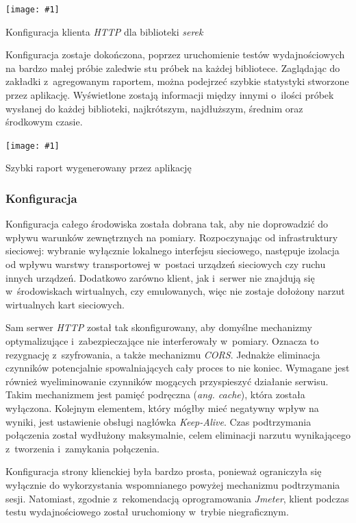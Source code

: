 \documentclass[12pt]{article}
\newcommand{\n}{\newline}
\newcommand{\putss}[3]{
\begin{captioned}[H]
	\centering
	\texttt{[image: \#1]}
	\caption{#2}
	\label{#3}
	\medskip
\end{captioned}
}
\newcommand{\nonpl}[1]{{\it #1}}
\newcommand{\code}[1]{{\it #1}}
\newcommand{\ang}[1]{\nonpl{ang. #1}}
\newcommand{\HTTP}{\nonpl{HTTP} }
\newcommand{\Jmeter}{\nonpl{Jmeter}\texttrademark}
\newcommand{\serek}{\nonpl{serek}}
\begin{document}
{{{				\putss{./img/jmeter_ss/http_serek_config.png}{ Konfiguracja klienta \HTTP dla biblioteki \serek}{jmeter_config_http}

				Konfiguracja zostaje dokończona, poprzez uruchomienie testów wydajnościowych na bardzo małej próbie zaledwie stu próbek
				na każdej bibliotece. Zaglądając do zakładki z~agregowanym raportem, można podejrzeć szybkie statystyki stworzone przez aplikację. Wyświetlone
				zostają informacji między innymi o~ilości próbek wysłanej do każdej biblioteki, najkrótszym, najdłuższym, średnim oraz środkowym czasie.

				\putss{./img/jmeter_ss/aggregate_report.png}{ Szybki raport wygenerowany przez aplikację}{jmeter_report}
			}

			{
				\subsubsection{Konfiguracja}

				Konfiguracja całego środowiska została dobrana tak, aby nie doprowadzić do wpływu warunków zewnętrznych na pomiary. Rozpoczynając od infrastruktury sieciowej:
				wybranie wyłącznie lokalnego interfejsu sieciowego, następuje izolacja od wpływu warstwy transportowej w~postaci urządzeń sieciowych czy ruchu innych urządzeń.
				Dodatkowo zarówno klient, jak i~serwer nie znajdują się w~środowiskach wirtualnych, czy emulowanych, więc nie zostaje dołożony narzut wirtualnych kart sieciowych.\n

				Sam serwer \HTTP został tak skonfigurowany, aby domyślne mechanizmy optymalizujące i~zabezpieczające nie interferowały w~pomiary. Oznacza to rezygnację z~szyfrowania,
				a także mechanizmu \nonpl{CORS}. Jednakże eliminacja czynników potencjalnie spowalniających cały proces to nie koniec. Wymagane jest również wyeliminowanie
				czynników mogących przyspieszyć działanie serwisu. Takim mechanizmem jest pamięć podręczna (\ang{cache}), która została wyłączona. Kolejnym elementem, który mógłby mieć negatywny
				wpływ na wyniki, jest ustawienie obsługi nagłówka \code{Keep-Alive}. Czas podtrzymania połączenia został wydłużony maksymalnie, celem eliminacji narzutu wynikającego
				z~tworzenia i~zamykania połączenia.\n

				Konfiguracja strony klienckiej była bardzo prosta, ponieważ ograniczyła się wyłącznie do wykorzystania wspomnianego powyżej mechanizmu podtrzymania sesji. Natomiast,
				zgodnie z~rekomendacją oprogramowania \Jmeter, klient podczas testu wydajnościowego został uruchomiony w~trybie niegraficznym.\n

}}}
\end{document}
